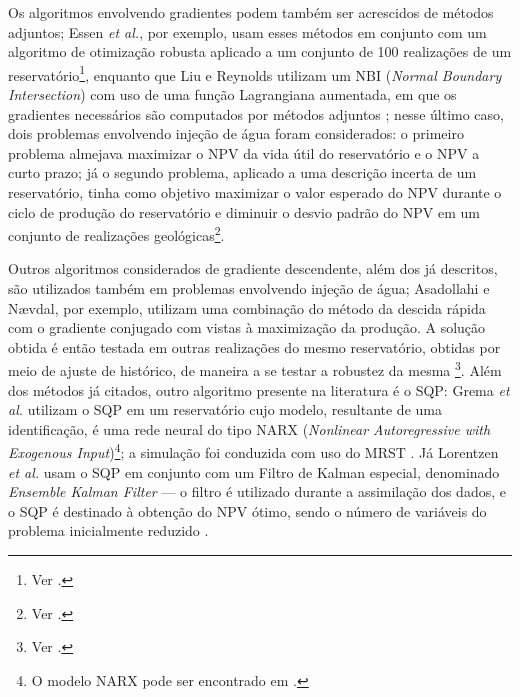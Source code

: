Os algoritmos envolvendo gradientes podem tamb\'{e}m ser acrescidos de m\'{e}todos adjuntos; Essen \textit{et al.}, por exemplo, usam esses m\'{e}todos em conjunto com um algoritmo de otimiza\c{c}\~{a}o robusta aplicado a um conjunto de 100 realiza\c{c}\~{o}es de um reservat\'{o}rio\footnote{Ver \cite{SPE:RWO}.}, enquanto que Liu e Reynolds utilizam um NBI (\textit{Normal Boundary Intersection}) com uso de uma fun\c{c}\~{a}o Lagrangiana aumentada, em que os gradientes necess\'{a}rios s\~{a}o computados por m\'{e}todos adjuntos \cite{GEO:LIU}; nesse \'{u}ltimo caso, dois problemas envolvendo inje\c{c}\~{a}o de \'{a}gua foram considerados: o primeiro problema almejava maximizar o NPV da vida \'{u}til do reservat\'{o}rio e o NPV a curto prazo; j\'{a} o segundo problema, aplicado a uma descri\c{c}\~{a}o incerta de um reservat\'{o}rio, tinha como objetivo maximizar o valor esperado do NPV durante o ciclo de produ\c{c}\~{a}o do reservat\'{o}rio e diminuir o desvio padr\~{a}o do NPV em um conjunto de realiza\c{c}\~{o}es geol\'{o}gicas\footnote{Ver \cite{GEO:LIU}.}.

Outros algoritmos considerados de gradiente descendente, al\'{e}m dos j\'{a} descritos, s\~{a}o utilizados tamb\'{e}m em problemas envolvendo inje\c{c}\~{a}o de \'{a}gua; Asadollahi e N{\ae}vdal, por exemplo, utilizam uma combina\c{c}\~{a}o do m\'{e}todo da descida r\'{a}pida com o gradiente conjugado com vistas \`{a} maximiza\c{c}\~{a}o da produ\c{c}\~{a}o. A solu\c{c}\~{a}o obtida \'{e} ent\~{a}o testada em outras realiza\c{c}\~{o}es do mesmo reservat\'{o}rio, obtidas por meio de ajuste de hist\'{o}rico, de maneira a se testar a robustez da mesma \footnote{Ver \cite{SPE:WFO}.}. Al\'{e}m dos m\'{e}todos j\'{a} citados, outro algoritmo presente na literatura \'{e} o SQP: Grema \textit{et al.} utilizam o SQP em um reservat\'{o}rio cujo modelo, resultante de uma identifica\c{c}\~{a}o, \'{e} uma rede neural do tipo NARX (\textit{Nonlinear Autoregressive with Exogenous Input})\footnote{O modelo NARX pode ser encontrado em \cite[p. 390]{aguirre}.}; a simula\c{c}\~{a}o foi conduzida com uso do MRST \cite{grema2017optimization}. J\'{a} Lorentzen \textit{et al.} usam o SQP em conjunto com um Filtro de Kalman especial, denominado \textit{Ensemble Kalman Filter} --- o filtro \'{e} utilizado durante a assimila\c{c}\~{a}o dos dados, e o SQP \'{e} destinado \`{a} obten\c{c}\~{a}o do NPV \'{o}timo, sendo o n\'{u}mero de vari\'{a}veis do problema inicialmente reduzido \cite{lorentzen2009sqp}.

